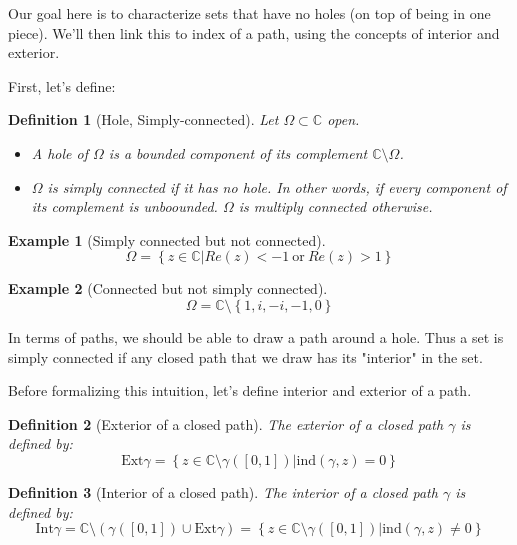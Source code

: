 \documentclass{article}
\newtheorem*{defi}{Definition}
\newtheorem*{example}{Example}
\begin{document}
Our goal here is to characterize sets that have no holes (on top of being in one piece). We'll then link this to index of a path, using the concepts of interior and exterior.

First, let's define:

\begin{defi}[Hole, Simply-connected]
    Let $\Omega\subset\mathbb{C}$ open.

    \begin{itemize}
        \item A hole of $\Omega$ is a bounded component of its complement $\mathbb{C} \setminus \Omega$.
        \item $\Omega$ is simply connected if it has no hole. In other words, if every component of its complement is unboounded. $\Omega$ is multiply connected otherwise.
    \end{itemize}
\end{defi}

\begin{example}[Simply connected but not connected]
    $$\Omega = \left\lbrace z \in \mathbb{C} \bigg\vert Re(z) < -1 ~\mathrm{or}~ Re(z) > 1 \right\rbrace$$
\end{example}

\begin{example}[Connected but not simply connected]
    $$\Omega = \mathbb{C} \setminus \left\lbrace 1, i, -i, -1, 0 \right\rbrace$$
\end{example}

In terms of paths, we should be able to draw a path around a hole. Thus a set is simply connected if any closed path that we draw has its "interior" in the set.

Before formalizing this intuition, let's define interior and exterior of a path.

\begin{defi}[Exterior of a closed path]
    The exterior of a closed path $\gamma$ is defined by:
    $$ \mathrm{Ext}\gamma = \left\lbrace z \in \mathbb{C} \setminus \gamma([0,1]) \bigg\vert  \mathrm{ind}(\gamma, z) = 0 \right\rbrace$$
\end{defi}

\begin{defi}[Interior of a closed path]
    The interior of a closed path $\gamma$ is defined by:
    $$ \mathrm{Int}\gamma = \mathbb{C} \setminus \left( \gamma([0,1]) \cup \mathrm{Ext}\gamma\right ) = \left\lbrace z \in \mathbb{C} \setminus \gamma([0,1]) \bigg\vert  \mathrm{ind}(\gamma, z) \neq 0 \right\rbrace$$
\end{defi}
\end{document}
